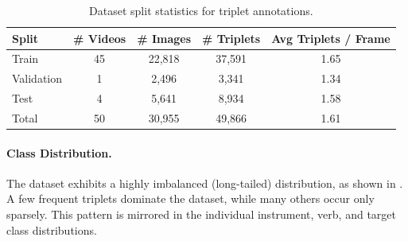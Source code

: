 \begin{table}[h!]
\centering
\begin{tabular}{lcccc}
\hline
\textbf{Split} & \textbf{\# Videos} & \textbf{\# Images} & \textbf{\# Triplets} & \textbf{Avg Triplets / Frame} \\
\hline
Train & 45 & 22,818 & 37,591 & 1.65 \\
Validation & 1 & 2,496 & 3,341   & 1.34 \\
Test & 4 & 5,641 & 8,934  & 1.58 \\
\hline
Total & 50 & 30,955 & 49,866  & 1.61 \\
\hline
\end{tabular}
\caption{Dataset split statistics for triplet annotations.}
\label{tab:dataset-split-stats}
\end{table}



\paragraph{Class Distribution.}
The dataset exhibits a highly imbalanced (long-tailed) distribution, as shown in . A few frequent triplets dominate the dataset, while many others occur only sparsely. This pattern is mirrored in the individual instrument, verb, and target class distributions.



